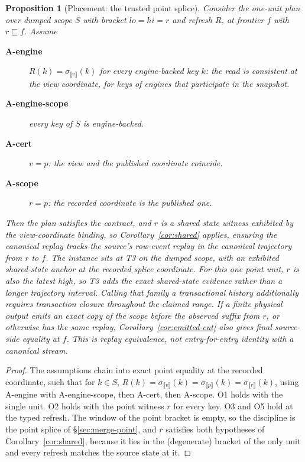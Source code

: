 \documentclass[sigconf,nonacm,10pt]{acmart}
\theoremstyle{plain}
\newtheorem{proposition}{Proposition}
\theoremstyle{definition}
\newcommand{\den}[1]{\llbracket #1 \rrbracket}   %
\newcommand{\pre}{\sqsubseteq}                   %
\begin{document}
\begin{proposition}[Placement: the trusted point
splice]\label{prop:splice}
Consider the one-unit plan over dumped scope $S$ with bracket
$lo = hi = r$ and refresh $R$, at frontier $f$ with $r \pre f$.
Assume
\begin{description}
\item[\textbf{A-engine}] $R(k) = \sigma_{\den{v}}(k)$ for every
engine-backed key $k$: the read is consistent at the view
coordinate, for keys of engines that participate in the snapshot.
\item[\textbf{A-engine-scope}] every key of $S$ is engine-backed.
\item[\textbf{A-cert}] $v = p$: the view and the published
coordinate coincide.
\item[\textbf{A-scope}] $r = p$: the recorded coordinate is the
published one.
\end{description}
Then the plan satisfies the contract, and $r$ is a shared state
witness exhibited by the view-coordinate binding, so
Corollary~\ref{cor:shared} applies, ensuring the canonical replay tracks the
source's row-event replay in the canonical trajectory
from $r$ to $f$. The instance sits at T3 on the dumped scope, with an
exhibited shared-state anchor at the recorded splice coordinate. For
this one point unit, $r$ is also the latest high, so T3 adds the exact
shared-state evidence rather than a longer trajectory interval.
Calling that family a transactional history additionally requires
transaction closure throughout the claimed range. If a finite physical
output emits an exact copy of the scope before the observed suffix from
$r$, or otherwise has the same replay, Corollary~\ref{cor:emitted-cut}
also gives final source-side equality at $f$. This is replay
equivalence, not entry-for-entry identity with a canonical stream.
\end{proposition}

\begin{proof}
The assumptions chain into exact point equality at the recorded
coordinate, such that for $k \in S$,
$R(k) = \sigma_{\den{v}}(k) = \sigma_{\den{p}}(k) =
\sigma_{\den{r}}(k)$, using A-engine with A-engine-scope, then
A-cert, then A-scope. O1 holds with the single unit. O2 holds
with the point witness $r$ for every key. O3 and O5 hold at the
typed refresh. The window of the point bracket is empty, so the
discipline is the point splice of \S\ref{sec:merge-point}, and
$r$ satisfies both hypotheses of Corollary~\ref{cor:shared}, because it
lies in the (degenerate) bracket of the only unit and every
refresh matches the source state at it.
\end{proof}
\end{document}
